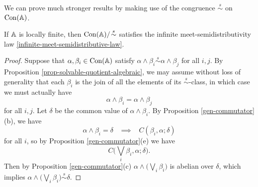 \begin{appendices}
We can prove much stronger results by making use of the congruence $\stackrel{s}{\sim}$ on $\operatorname{Con}(\mathbb{A})$.

\begin{thm} If $\mathbb{A}$ is locally finite, then $\operatorname{Con}(\mathbb{A})/\!\stackrel{s}{\sim}$ satisfies the infinite meet-semidistributivity law \eqref{infinite-meet-semidistributive-law}.
\end{thm}
\begin{proof} Suppose that $\alpha, \beta_i \in \operatorname{Con}(\mathbb{A})$ satisfy $\alpha \wedge \beta_i \stackrel{s}{\sim} \alpha \wedge \beta_j$ for all $i,j$. By Proposition \ref{prop-solvable-quotient-algebraic}, we may assume without loss of generality that each $\beta_i$ is the join of all the elements of its $\stackrel{s}{\sim}$-class, in which case we must actually have
\[
\alpha \wedge \beta_i = \alpha \wedge \beta_j
\]
for all $i,j$. Let $\delta$ be the common value of $\alpha \wedge \beta_i$. By Proposition \ref{gen-commutator}(b), we have
\[
\alpha \wedge \beta_i = \delta \;\;\; \implies \;\;\; C(\beta_i, \alpha; \delta)
\]
for all $i$, so by Proposition \ref{gen-commutator}(e) we have
\[
C\big(\bigvee_i \beta_i, \alpha; \delta\big).
\]
Then by Proposition \ref{gen-commutator}(c) $\alpha \wedge \big(\bigvee_i \beta_i\big)$ is abelian over $\delta$, which implies $\alpha \wedge \big(\bigvee_i \beta_i\big) \stackrel{s}{\sim} \delta$.

\end{proof}


\end{appendices}
